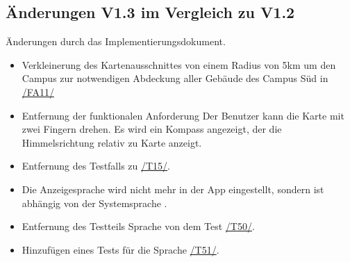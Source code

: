 \subsection*{Änderungen V1.3 im Vergleich zu V1.2}
Änderungen durch das Implementierungsdokument.
\begin{itemize}
    \item Verkleinerung des Kartenausschnittes von einem Radius von 5km um den \Gls{Campus} zur notwendigen Abdeckung aller Gebäude des \Gls{Campus} Süd in \hyperref[/FA11/]{/FA11/}
    \item Entfernung der funktionalen Anforderung \label{/FA15/} \n Der \Gls{Benutzer} kann die \Gls{Karte} mit zwei Fingern drehen. Es wird ein Kompass angezeigt, der die Himmelsrichtung relativ zu \Gls{Karte} anzeigt.
    \item Entfernung des Testfalls \label{/T181/} zu \hyperref[/T15/]{/T15/}.
    \item Die Anzeigesprache wird nicht mehr in der App eingestellt, sondern ist abhängig von der Systemsprache \label{/FA51/}.
    \item Entfernung des Testteils Sprache von dem Test \hyperref[/T50/]{/T50/}.
    \item Hinzufügen eines Tests für die Sprache \hyperref[/T51/]{/T51/}.
\end{itemize}